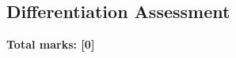 \documentclass[../c1]{subfiles}
\begin{document}
\subsection*{Differentiation Assessment}
\thispagestyle{fancy}



\begin{flushright}
\textbf{Total marks: [0]}
\end{flushright}
\end{document}
